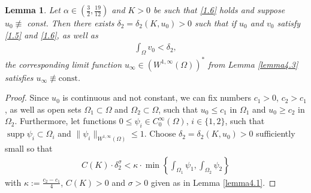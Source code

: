\documentclass[12pt]{article}
\DeclareMathOperator{\osc}{osc}
\theoremstyle{plain}
\newtheorem{lemma}{Lemma}[section]
\theoremstyle{definition}
\numberwithin{equation}{section}
\begin{document}
\begin{lemma}\label{lemma4.6}
Let $\alpha \in \left( \frac{3}{2}, \frac{19}{12} \right)$ and $K > 0$ be such that \eqref{1.6} holds and suppose $u_0\not\equiv$ const. Then there exists $\delta_2 = \delta_2(K, u_0)>0$ such that if $u_0$ and $v_0$ satisfy \eqref{1.5} and \eqref{1.6}, as well as
\begin{align}\label{4.11-1}
    \int_{\Omega}v_0< \delta_2,
\end{align}
the corresponding limit function $u_{\infty} \in (W^{1,\infty}(\Omega))^*$ from Lemma \ref{lemma4.3} satisfies
$u_{\infty} \not\equiv \mathrm{const}$.
\end{lemma}
\begin{proof}
     Since $u_{0}$ is continuous and not constant, we can fix numbers $c_{1}>0$, $c_{2}>c_{1}$, as well as open sets $\Omega_1\subset\Omega$ and $\Omega_2\subset\Omega$, such that $u_{0}\leq c_{1}$ in $\Omega_1$ and $u_{0}\geq c_{2}$ in $\Omega_2$.  Furthermore,     let  functions $0\leq \psi_{i}\in C^{\infty}_{0}(\Omega)$, $i\in\{1,2\}$, such that $\operatorname{supp}\psi_{i}\subset \Omega_i$ and $\|\psi_{i}\|_{W^{1,\infty}(\Omega)}\leq1$.
     Choose $\delta_2= \delta_2(K,%
     u_0)>0$ sufficiently small so that %
\begin{align}\label{4.12}
    C(K)\cdot\delta_2^{\sigma}<\kappa\cdot \min\left\{\int_{\Omega_1}\psi_1,\int_{\Omega_2}\psi_2\right\}
\end{align}
with $\kappa:=\frac{c_{2}-c_{1}}{4}$,  $C(K)>0$ and $\sigma>0$  given as in Lemma \ref{lemma4.1}.


\end{proof}
\end{document}
